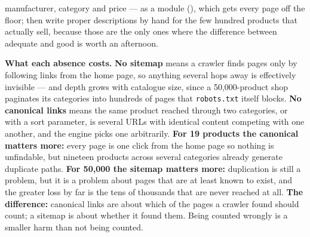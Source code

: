 \begin{ans}
        manufacturer, category and price --- as a module
        (), which gets every page off the floor; then write
        proper descriptions by hand for the few hundred products that actually
        sell, because those are the only ones where the difference between
        adequate and good is worth an afternoon.
  \item \textbf{What each absence costs.} \textbf{No sitemap} means a crawler
        finds pages only by following links from the home page, so anything
        several hops away is effectively invisible --- and depth grows with
        catalogue size, since a 50{,}000-product shop paginates its categories
        into hundreds of pages that \texttt{robots.txt} itself blocks.
        \textbf{No canonical links} means the same product reached through two
        categories, or with a sort parameter, is several URLs with identical
        content competing with one another, and the engine picks one
        arbitrarily. \textbf{For 19 products the canonical matters more:} every
        page is one click from the home page so nothing is unfindable, but
        nineteen products across several categories already generate duplicate
        paths. \textbf{For 50{,}000 the sitemap matters more:} duplication is
        still a problem, but it is a problem about pages that are at least
        known to exist, and the greater loss by far is the tens of thousands
        that are never reached at all. \textbf{The difference:} canonical links
        are about which of the pages a crawler found should count; a sitemap is
        about whether it found them. Being counted wrongly is a smaller harm
        than not being counted.
\end{ans}

